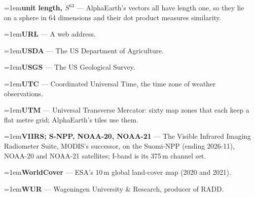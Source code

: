\documentclass[10pt]{article}
\newcommand{\gl}[2]{\par\hangindent=1em\hangafter=1\textbf{#1} --- #2\par}
\begin{document}
\gl{unit length, $S^{63}$}{AlphaEarth's vectors all have length one, so they lie on a sphere in 64 dimensions and their dot product measures similarity.}
\gl{URL}{A web address.}
\gl{USDA}{The US Department of Agriculture.}
\gl{USGS}{The US Geological Survey.}
\gl{UTC}{Coordinated Universal Time, the time zone of weather observations.}
\gl{UTM}{Universal Transverse Mercator: sixty map zones that each keep a flat metre grid; AlphaEarth's tiles use them.}
\gl{VIIRS; S-NPP, NOAA-20, NOAA-21}{The Visible Infrared Imaging Radiometer Suite, MODIS's successor, on the Suomi-NPP (ending 2026-11), NOAA-20 and NOAA-21 satellites; I-band is its 375\,m channel set.}
\gl{WorldCover}{ESA's 10\,m global land-cover map (2020 and 2021).}
\gl{WUR}{Wageningen University \& Research, producer of RADD.}
\normalsize
\end{document}
